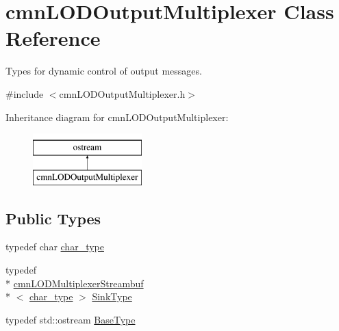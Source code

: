 \hypertarget{classcmn_l_o_d_output_multiplexer}{\section{cmn\-L\-O\-D\-Output\-Multiplexer Class Reference}
\label{classcmn_l_o_d_output_multiplexer}
}


Types for dynamic control of output messages.  




{\ttfamily \#include $<$cmn\-L\-O\-D\-Output\-Multiplexer.\-h$>$}

Inheritance diagram for cmn\-L\-O\-D\-Output\-Multiplexer\-:\begin{figure}[H]
\begin{center}
\leavevmode
\includegraphics[height=2.000000cm]{d0/df0/classcmn_l_o_d_output_multiplexer}
\end{center}
\end{figure}
\subsection*{Public Types}
\begin{DoxyCompactItemize}
\item 
typedef char \hyperlink{classcmn_l_o_d_output_multiplexer_a8228345f1af2deaa59cda6f4958c5b3b}{char\-\_\-type}
\item 
typedef \\*
\hyperlink{classcmn_l_o_d_multiplexer_streambuf}{cmn\-L\-O\-D\-Multiplexer\-Streambuf}\\*
$<$ \hyperlink{classcmn_l_o_d_output_multiplexer_a8228345f1af2deaa59cda6f4958c5b3b}{char\-\_\-type} $>$ \hyperlink{classcmn_l_o_d_output_multiplexer_a8020e1fe3db5ba7fb371c4554b986d6c}{Sink\-Type}
\item 
typedef std\-::ostream \hyperlink{classcmn_l_o_d_output_multiplexer_a5c02280584b487c3d478b0fee8f829ef}{Base\-Type}
\end{DoxyCompactItemize}
